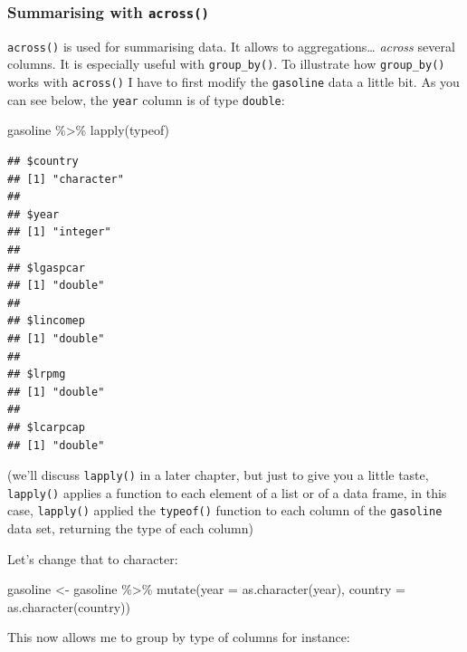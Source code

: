 \documentclass[
]{article}
\newenvironment{Shaded}{\begin{snugshade}}{\end{snugshade}}
\newcommand{\AttributeTok}[1]{\textcolor[rgb]{0.77,0.63,0.00}{#1}}
\newcommand{\FunctionTok}[1]{\textcolor[rgb]{0.00,0.00,0.00}{#1}}
\newcommand{\NormalTok}[1]{#1}
\newcommand{\OtherTok}[1]{\textcolor[rgb]{0.56,0.35,0.01}{#1}}
\newcommand{\SpecialCharTok}[1]{\textcolor[rgb]{0.00,0.00,0.00}{#1}}
\begin{document}
\hypertarget{summarising-with-across}{%
\subsubsection{\texorpdfstring{Summarising with \texttt{across()}}{Summarising with across()}}\label{summarising-with-across}}

\texttt{across()} is used for summarising data. It allows to aggregations\ldots{} \emph{across} several columns. It
is especially useful with \texttt{group\_by()}. To illustrate how \texttt{group\_by()} works with \texttt{across()} I have
to first modify the \texttt{gasoline} data a little bit. As you can see below, the \texttt{year} column is of
type \texttt{double}:

\begin{Shaded}
\begin{Highlighting}[]
\NormalTok{gasoline }\SpecialCharTok{\%\textgreater{}\%}
  \FunctionTok{lapply}\NormalTok{(typeof)}
\end{Highlighting}
\end{Shaded}

\begin{verbatim}
## $country
## [1] "character"
## 
## $year
## [1] "integer"
## 
## $lgaspcar
## [1] "double"
## 
## $lincomep
## [1] "double"
## 
## $lrpmg
## [1] "double"
## 
## $lcarpcap
## [1] "double"
\end{verbatim}

(we'll discuss \texttt{lapply()} in a later chapter, but just to give you a little taste, \texttt{lapply()} applies
a function to each element of a list or of a data frame, in this case, \texttt{lapply()} applied the \texttt{typeof()}
function to each column of the \texttt{gasoline} data set, returning the type of each column)

Let's change that to character:

\begin{Shaded}
\begin{Highlighting}[]
\NormalTok{gasoline }\OtherTok{\textless{}{-}}\NormalTok{ gasoline }\SpecialCharTok{\%\textgreater{}\%}
  \FunctionTok{mutate}\NormalTok{(}\AttributeTok{year =} \FunctionTok{as.character}\NormalTok{(year),}
         \AttributeTok{country =} \FunctionTok{as.character}\NormalTok{(country))}
\end{Highlighting}
\end{Shaded}

This now allows me to group by type of columns for instance:
\end{document}
